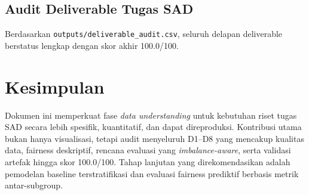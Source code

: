 \documentclass[conference]{IEEEtran}
\begin{document}
\subsection{Audit Deliverable Tugas SAD}
Berdasarkan \texttt{outputs/deliverable\_audit.csv}, seluruh delapan deliverable berstatus lengkap dengan skor akhir 100.0/100.

\section{Kesimpulan}
Dokumen ini memperkuat fase \textit{data understanding} untuk kebutuhan riset tugas SAD secara lebih spesifik, kuantitatif, dan dapat direproduksi. Kontribusi utama bukan hanya visualisasi, tetapi audit menyeluruh D1--D8 yang mencakup kualitas data, fairness deskriptif, rencana evaluasi yang \textit{imbalance-aware}, serta validasi artefak hingga skor 100.0/100. Tahap lanjutan yang direkomendasikan adalah pemodelan baseline terstratifikasi dan evaluasi fairness prediktif berbasis metrik antar-subgroup.
\end{document}
